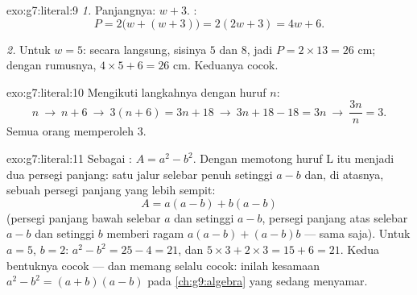 \begin{solution}{exo:g7:literal:9}
\emph{1.} Panjangnya: $w + 3$. :
\[
P = 2\bigl(w + (w + 3)\bigr) = 2(2w + 3) = 4w + 6 .
\]

\emph{2.} Untuk $w = 5$: secara langsung, sisinya $5$ dan $8$, jadi
$P = 2 \times 13 = 26$ cm; dengan rumusnya, $4 \times 5 + 6 = 26$ cm.
Keduanya cocok.
\end{solution}

\begin{solution}{exo:g7:literal:10}
Mengikuti langkahnya dengan huruf $n$:
\[
n \ \to\ n + 6 \ \to\ 3(n + 6) = 3n + 18 \ \to\ 3n + 18 - 18 = 3n
\ \to\ \frac{3n}{n} = 3 .
\]
Semua orang memperoleh $3$.
\end{solution}

\begin{solution}{exo:g7:literal:11}
Sebagai : $A = a^2 - b^2$. Dengan memotong huruf L itu menjadi
dua persegi panjang: satu jalur selebar penuh setinggi $a - b$ dan, di
atasnya, sebuah persegi panjang yang lebih sempit:
\[
A = a(a - b) + b(a - b)
\]
(persegi panjang bawah selebar $a$ dan setinggi $a - b$, persegi
panjang atas selebar $a - b$ dan setinggi $b$ memberi ragam
$a(a-b) + (a-b)b$ --- sama saja). Untuk $a = 5$, $b = 2$:
$a^2 - b^2 = 25 - 4 = 21$, dan
$5 \times 3 + 2 \times 3 = 15 + 6 = 21$. Kedua bentuknya cocok ---
dan memang selalu cocok: inilah kesamaan $a^2 - b^2 = (a + b)(a - b)$
pada \cref{ch:g9:algebra} yang sedang menyamar.
\end{solution}

